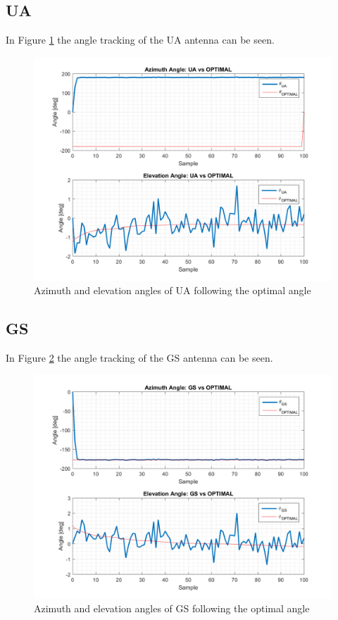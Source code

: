 \subsection{UA}
In Figure \ref{fig:s2_ua} the angle tracking of the UA antenna can be seen.

\begin{figure}[H]
	\centering
	\includegraphics[scale=0.75]{figures/s2_ua.png}
	\caption{Azimuth and elevation angles of UA following the optimal angle}
	\label{fig:s2_ua}
\end{figure}

\subsection{GS}
In Figure \ref{fig:s2_gs} the angle tracking of the GS antenna can be seen.

\begin{figure}[H]
	\centering
	\includegraphics[scale=0.75]{figures/s2_gs.png}
	\caption{Azimuth and elevation angles of GS following the optimal angle}
	\label{fig:s2_gs}
\end{figure}

